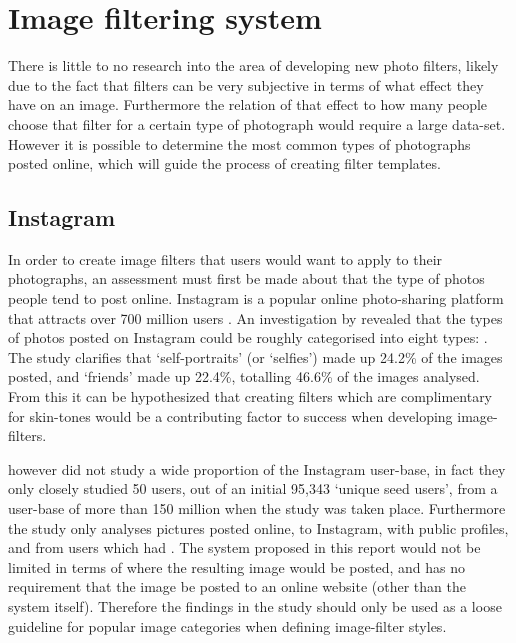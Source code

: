 \documentclass[a4paper,12pt]{report}
\begin{document}
  \section{Image filtering system}
    There is little to no research into the area of developing new photo filters, likely due to the fact that filters can be very subjective in terms of what effect they have on an image. Furthermore the relation of that effect to how many people choose that filter for a certain type of photograph would require a large data-set. However it is possible to determine the most common types of photographs posted online, which will guide the process of creating filter templates.

    \subsection{Instagram} \label{sec:lit-insta}
      In order to create image filters that users would want to apply to their photographs, an assessment must first be made about that the type of photos people tend to post online. Instagram is a popular online photo-sharing platform that attracts over 700 million users \citep{instagram2017users}. An investigation by \cite{hu2014we} revealed that the types of photos posted on Instagram could be roughly categorised into eight types: . The study clarifies that ‘self-portraits’ (or ‘selfies’) made up 24.2\% of the images posted, and ‘friends’ made up 22.4\%, totalling 46.6\% of the images analysed. From this it can be hypothesized that creating filters which are complimentary for skin-tones would be a contributing factor to success when developing image-filters.

      \cite{hu2014we} however did not study a wide proportion of the Instagram user-base, in fact they only closely studied 50 users, out of an initial 95,343 ‘unique seed users’, from a user-base of more than 150 million when the study was taken place. Furthermore the study only analyses pictures posted online, to Instagram, with public profiles, and from users which had . The system proposed in this report would not be limited in terms of where the resulting image would be posted, and has no requirement that the image be posted to an online website (other than the system itself). Therefore the findings in the study should only be used as a loose guideline for popular image categories when defining image-filter styles.
\end{document}
